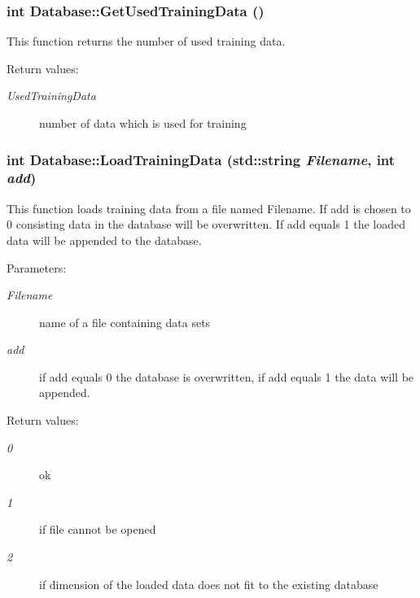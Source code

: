 \subsubsection{\setlength{\rightskip}{0pt plus 5cm}int Database::Get\-Used\-Training\-Data ()}\label{classDatabase_a12}


This function returns the number of used training data.

\begin{Desc}
\item[Return values: ]\par
\begin{description}
\item[{\em 
Used\-Training\-Data}]number of data which is used for training \end{description}
\end{Desc}
\subsubsection{\setlength{\rightskip}{0pt plus 5cm}int Database::Load\-Training\-Data (std::string {\em Filename}, int {\em add})}\label{classDatabase_a7}


This function loads training data from a file named Filename. If add is chosen to 0 consisting data in the database will be overwritten. If add equals 1 the loaded data will be appended to the database.

\begin{Desc}
\item[Parameters: ]\par
\begin{description}
\item[{\em 
Filename}]name of a file containing data sets \item[{\em 
add}]if add equals 0 the database is overwritten, if add equals 1 the data will be appended. \end{description}
\end{Desc}
\begin{Desc}
\item[Return values: ]\par
\begin{description}
\item[{\em 
0}]ok \item[{\em 
1}]if file cannot be opened \item[{\em 
2}]if dimension of the loaded data does not fit to the existing database \end{description}
\end{Desc}
